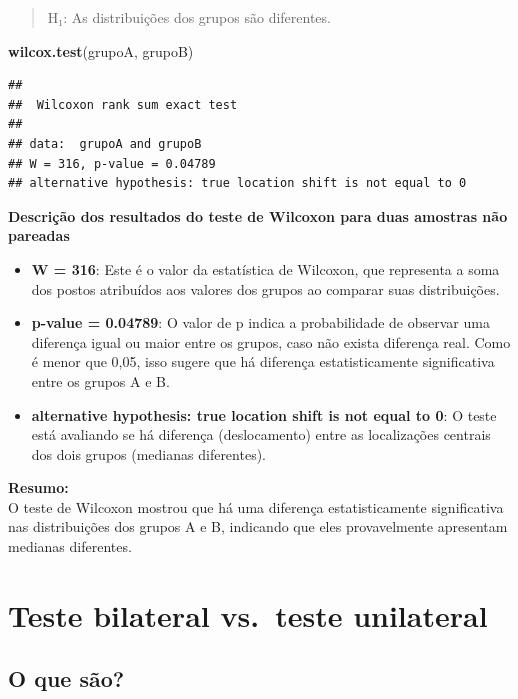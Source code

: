 \documentclass[
]{book}
\newenvironment{Shaded}{\begin{snugshade}}{\end{snugshade}}
\newcommand{\FunctionTok}[1]{\textcolor[rgb]{0.13,0.29,0.53}{\textbf{#1}}}
\newcommand{\NormalTok}[1]{#1}
\providecommand{\tightlist}{%
  \setlength{\itemsep}{0pt}\setlength{\parskip}{0pt}}
\begin{document}
\begin{quote}
H₁: As distribuições dos grupos são diferentes.
\end{quote}

\begin{Shaded}
\begin{Highlighting}[]
\FunctionTok{wilcox.test}\NormalTok{(grupoA, grupoB)}
\end{Highlighting}
\end{Shaded}

\begin{verbatim}
## 
##  Wilcoxon rank sum exact test
## 
## data:  grupoA and grupoB
## W = 316, p-value = 0.04789
## alternative hypothesis: true location shift is not equal to 0
\end{verbatim}

\textbf{Descrição dos resultados do teste de Wilcoxon para duas amostras não pareadas}

\begin{itemize}
\tightlist
\item
  \textbf{W = 316}: Este é o valor da estatística de Wilcoxon, que representa a soma dos postos atribuídos aos valores dos grupos ao comparar suas distribuições.
\item
  \textbf{p-value = 0.04789}: O valor de p indica a probabilidade de observar uma diferença igual ou maior entre os grupos, caso não exista diferença real. Como é menor que 0,05, isso sugere que há diferença estatisticamente significativa entre os grupos A e B.
\item
  \textbf{alternative hypothesis: true location shift is not equal to 0}: O teste está avaliando se há diferença (deslocamento) entre as localizações centrais dos dois grupos (medianas diferentes).
\end{itemize}

\textbf{Resumo:}\\
O teste de Wilcoxon mostrou que há uma diferença estatisticamente significativa nas distribuições dos grupos A e B, indicando que eles provavelmente apresentam medianas diferentes.

\section{Teste bilateral vs.~teste unilateral}\label{teste-bilateral-vs.-teste-unilateral}

\subsection{O que são?}\label{o-que-suxe3o}
\end{document}
